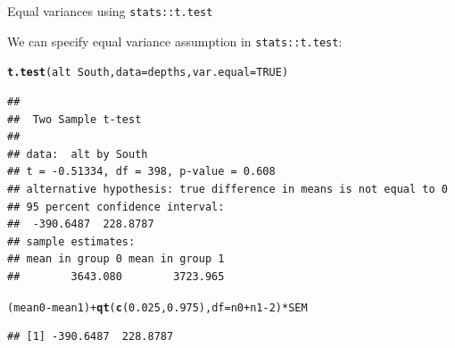\documentclass[handout]{beamer}\usepackage[]{graphicx}\usepackage[]{color}
\newcommand{\hlnum}[1]{\textcolor[rgb]{0.686,0.059,0.569}{#1}}%
\newcommand{\hlopt}[1]{\textcolor[rgb]{0,0,0}{#1}}%
\newcommand{\hlstd}[1]{\textcolor[rgb]{0.345,0.345,0.345}{#1}}%
\newcommand{\hlkwc}[1]{\textcolor[rgb]{0.333,0.667,0.333}{#1}}%
\newcommand{\hlkwd}[1]{\textcolor[rgb]{0.737,0.353,0.396}{\textbf{#1}}}%
\newenvironment{knitrout}{}{} %
\begin{document}
\begin{frame}[fragile]{Equal variances using \texttt{stats::t.test}}

We can specify equal variance assumption in \texttt{stats::t.test}:

\begin{knitrout}\scriptsize
{}\color{fgcolor}
\begin{alltt}
\hlkwd{t.test}\hlstd{(alt} \hlopt{~} \hlstd{South,} \hlkwc{data} \hlstd{= depths,} \hlkwc{var.equal} \hlstd{=} \hlnum{TRUE}\hlstd{)}
\end{alltt}
\begin{verbatim}
## 
## 	Two Sample t-test
## 
## data:  alt by South
## t = -0.51334, df = 398, p-value = 0.608
## alternative hypothesis: true difference in means is not equal to 0
## 95 percent confidence interval:
##  -390.6487  228.8787
## sample estimates:
## mean in group 0 mean in group 1 
##        3643.080        3723.965
\end{verbatim}
\begin{alltt}
\hlstd{(mean0} \hlopt{-} \hlstd{mean1)} \hlopt{+} \hlkwd{qt}\hlstd{(}\hlkwd{c}\hlstd{(}\hlnum{0.025}\hlstd{,} \hlnum{0.975}\hlstd{),} \hlkwc{df} \hlstd{= n0} \hlopt{+} \hlstd{n1} \hlopt{-} \hlnum{2}\hlstd{)} \hlopt{*} \hlstd{SEM}
\end{alltt}
\begin{verbatim}
## [1] -390.6487  228.8787
\end{verbatim}

\end{knitrout}


\end{frame}
\end{document}
